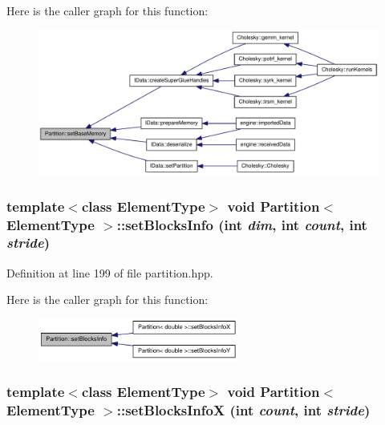 Here is the caller graph for this function:\nopagebreak
\begin{figure}[H]
\begin{center}
\leavevmode
\includegraphics[width=335pt]{class_partition_a8ca97963e7769bec5e7c59f9e4660427_icgraph}
\end{center}
\end{figure}
\hypertarget{class_partition_a96a9021fbce8a82ff167ec8cffa5d9d2}{
\subsubsection[{setBlocksInfo}]{\setlength{\rightskip}{0pt plus 5cm}template$<$class ElementType$>$ void {\bf Partition}$<$ ElementType $>$::setBlocksInfo (int {\em dim}, \/  int {\em count}, \/  int {\em stride})}}
\label{class_partition_a96a9021fbce8a82ff167ec8cffa5d9d2}


Definition at line 199 of file partition.hpp.

Here is the caller graph for this function:\nopagebreak
\begin{figure}[H]
\begin{center}
\leavevmode
\includegraphics[width=186pt]{class_partition_a96a9021fbce8a82ff167ec8cffa5d9d2_icgraph}
\end{center}
\end{figure}
\hypertarget{class_partition_ad974cd0110425d8c8975908953847d61}{
\subsubsection[{setBlocksInfoX}]{\setlength{\rightskip}{0pt plus 5cm}template$<$class ElementType$>$ void {\bf Partition}$<$ ElementType $>$::setBlocksInfoX (int {\em count}, \/  int {\em stride})}}
\label{class_partition_ad974cd0110425d8c8975908953847d61}


